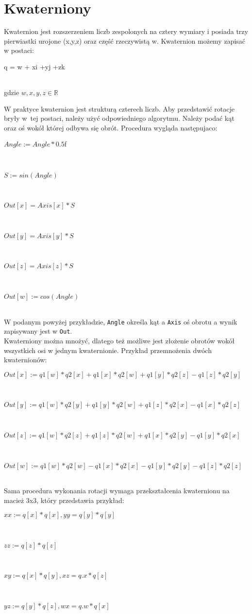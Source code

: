 \section{Kwaterniony}
Kwaternion jest rozszerzeniem liczb zespolonych na cztery wymiary i posiada trzy pierwiastki urojone (x,y,z) oraz część rzeczywistą w. Kwaternion możemy zapisać w postaci:\\
\centerline{q = w + xi +yj +zk}\\
gdzie  $w,x,y,z \in \mathbb{R}$

W praktyce kwaternion jest strukturą czterech liczb. Aby przedstawić rotacje bryły w~tej postaci, należy użyć odpowiedniego algorytmu. Należy podać kąt oraz oś wokół której odbywa się obrót. Procedura wygląda następujaco\cite{quat}: \\
\centerline{$Angle := Angle*0.5$f}\\
\centerline{$S := sin(Angle)$}\\
\centerline{$Out[x] = Axis[x] * S$}\\
\centerline{$Out[y] = Axis[y] * S$}\\
\centerline{$Out[z] = Axis[z] * S$}\\
\centerline{$Out[w] := cos(Angle)$}\\
W podanym powyżej przykładzie, \verb$Angle$ określa kąt a \verb$Axis$ oś obrotu a wynik zapisywany jest w \verb$Out$.\\
Kwaterniony można mnożyć, dlatego też możliwe jest złożenie obrotów wokół wszystkich osi w jednym kwaternionie. Przykład przemnożenia dwóch kwaternionów: \\
\centerline{$Out[x] := q1[w]*q2[x] + q1[x]*q2[w] + q1[y]*q2[z] - q1[z]*q2[y]$}\\
\centerline{$Out[y] := q1[w]*q2[y] + q1[y]*q2[w] + q1[z]*q2[x] - q1[x]*q2[z]$}\\
\centerline{$Out[z] := q1[w]*q2[z] + q1[z]*q2[w] + q1[x]*q2[y] - q1[y]*q2[x]$}\\
\centerline{$Out[w] := q1[w]*q2[w] - q1[x]*q2[x] - q1[y]*q2[y] - q1[z]*q2[z]$}\\
Sama procedura wykonania rotacji wymaga przekształcenia kwaternionu na macież 3x3, który przedstawia przykład:\\
\centerline{$xx := q[x] * q[x], yy = q[y] * q[y]$}\\
\centerline{$zz := q[z] * q[z]$}\\
\centerline{$xy := q[x] * q[y], xz = q.x * q[z]$}\\
\centerline{$yz := q[y] * q[z], wx = q.w * q[x]$}\\
